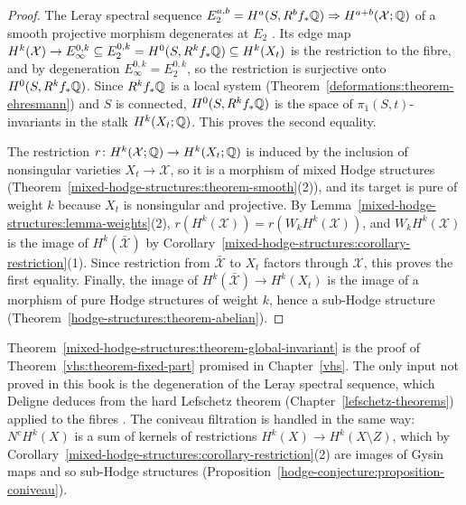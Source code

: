 \begin{proof}
The Leray spectral sequence $E_2^{a,b} = H^a(S, R^bf_*\mathbb{Q}) \Rightarrow H^{a+b}(\mathcal{X}; \mathbb{Q})$ of a smooth projective morphism degenerates at $E_2$ \cite{deligne-1968}. Its edge map
$H^k(\mathcal{X}) \to E_\infty^{0,k} \subseteq E_2^{0,k} = H^0(S, R^kf_*\mathbb{Q}) \subseteq H^k(X_t)$ is the restriction to the fibre, and by degeneration $E_\infty^{0,k} = E_2^{0,k}$, so the restriction is
surjective onto $H^0(S, R^kf_*\mathbb{Q})$. Since $R^kf_*\mathbb{Q}$ is a local system (Theorem~\ref{deformations:theorem-ehresmann}) and $S$ is connected, $H^0(S, R^kf_*\mathbb{Q})$ is the space of $\pi_1(S, t)$-invariants in the stalk
$H^k(X_t; \mathbb{Q})$. This proves the second equality.

The restriction $r \colon H^k(\mathcal{X}; \mathbb{Q}) \to H^k(X_t; \mathbb{Q})$ is induced by the inclusion of nonsingular varieties $X_t \to \mathcal{X}$, so it is a morphism of mixed Hodge structures
(Theorem~\ref{mixed-hodge-structures:theorem-smooth}(2)), and its target is pure of weight $k$ because $X_t$ is nonsingular and projective. By Lemma~\ref{mixed-hodge-structures:lemma-weights}(2),
$r(H^k(\mathcal{X})) = r(W_kH^k(\mathcal{X}))$, and $W_kH^k(\mathcal{X})$ is the image of $H^k(\bar{\mathcal{X}})$ by Corollary~\ref{mixed-hodge-structures:corollary-restriction}(1). Since restriction from
$\bar{\mathcal{X}}$ to $X_t$ factors through $\mathcal{X}$, this proves the first equality. Finally, the image of $H^k(\bar{\mathcal{X}}) \to H^k(X_t)$ is the image of a morphism of pure Hodge structures of
weight $k$, hence a sub-Hodge structure (Theorem~\ref{hodge-structures:theorem-abelian}).
\end{proof}

\begin{remark}\label{mixed-hodge-structures:remark-fixed-part}
Theorem~\ref{mixed-hodge-structures:theorem-global-invariant} is the proof of Theorem~\ref{vhs:theorem-fixed-part} promised in Chapter~\ref{vhs}. The only input not proved in this book is the degeneration
of the Leray spectral sequence, which Deligne deduces from the hard Lefschetz theorem (Chapter~\ref{lefschetz-theorems}) applied to the fibres \cite{deligne-1968}. The coniveau filtration is handled in
the same way: $N^cH^k(X)$ is a sum of kernels of restrictions $H^k(X) \to H^k(X \setminus Z)$, which by Corollary~\ref{mixed-hodge-structures:corollary-restriction}(2) are images of Gysin maps and so
sub-Hodge structures (Proposition~\ref{hodge-conjecture:proposition-coniveau}).
\end{remark}

